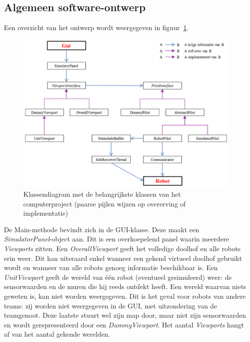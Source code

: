 \documentclass[tt3]{penoverslag}
\begin{document}
\subsection{Algemeen software-ontwerp}
\label{ssec:Sdesign}
Een overzicht van het ontwerp wordt weergegeven in figuur~\ref{fig:klasSoft}.\\

\begin{figure}
\centering
		\includegraphics[width=\textwidth]{KlasSoftware}
\caption[Klassendiagram computerproject]{Klassendiagram met de belangrijkste klassen van het computerproject (paarse pijlen wijzen op overerving of implementatie)}
\label{fig:klasSoft}
\end{figure}

De Main-methode bevindt zich in de GUI-klasse. Deze maakt een \textit{SimulatorPanel}-object aan. Dit is een overkoepelend panel waarin meerdere \textit{Viewports} zitten. Een \textit{OverallViewport} geeft het volledige doolhof en alle robots erin weer. Dit kan uiteraard enkel wanneer een gekend virtueel doolhof gebruikt wordt en wanneer van alle robots genoeg informatie beschikbaar is. Een \textit{UnitViewport} geeft de wereld van \'e\'en robot (eventueel gesimuleerd) weer: de sensorwaarden en de muren die hij reeds ontdekt heeft. Een wereld waarvan niets geweten is, kan niet worden weergegeven. Dit is het geval voor robots van andere teams: zij worden niet weergegeven in de GUI, met uitzondering van de teamgenoot. Deze laatste stuurt wel zijn map door, maar niet zijn sensorwaarden en wordt gerepresenteerd door een \textit{DummyViewport}. Het aantal \textit{Viewports} hangt af van het aantal gekende werelden.\\
\end{document}
